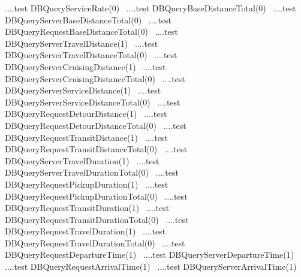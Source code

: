 \documentclass{article}
\def\nwendcode{\endtrivlist \endgroup}
\let\nwdocspar=\par
\begin{document}
\LA{}....test \code{}DBQueryServiceRate\edoc{}(0)~{\nwtagstyle{}}\RA{}
\LA{}....test \code{}DBQueryBaseDistanceTotal\edoc{}(0)~{\nwtagstyle{}}\RA{}
\LA{}....test \code{}DBQueryServerBaseDistanceTotal\edoc{}(0)~{\nwtagstyle{}}\RA{}
\LA{}....test \code{}DBQueryRequestBaseDistanceTotal\edoc{}(0)~{\nwtagstyle{}}\RA{}
\LA{}....test \code{}DBQueryServerTravelDistance\edoc{}(1)~{\nwtagstyle{}}\RA{}
\LA{}....test \code{}DBQueryServerTravelDistanceTotal\edoc{}(0)~{\nwtagstyle{}}\RA{}
\LA{}....test \code{}DBQueryServerCruisingDistance\edoc{}(1)~{\nwtagstyle{}}\RA{}
\LA{}....test \code{}DBQueryServerCruisingDistanceTotal\edoc{}(0)~{\nwtagstyle{}}\RA{}
\LA{}....test \code{}DBQueryServerServiceDistance\edoc{}(1)~{\nwtagstyle{}}\RA{}
\LA{}....test \code{}DBQueryServerServiceDistanceTotal\edoc{}(0)~{\nwtagstyle{}}\RA{}
\LA{}....test \code{}DBQueryRequestDetourDistance\edoc{}(1)~{\nwtagstyle{}}\RA{}
\LA{}....test \code{}DBQueryRequestDetourDistanceTotal\edoc{}(0)~{\nwtagstyle{}}\RA{}
\LA{}....test \code{}DBQueryRequestTransitDistance\edoc{}(1)~{\nwtagstyle{}}\RA{}
\LA{}....test \code{}DBQueryRequestTransitDistanceTotal\edoc{}(0)~{\nwtagstyle{}}\RA{}
\LA{}....test \code{}DBQueryServerTravelDuration\edoc{}(1)~{\nwtagstyle{}}\RA{}
\LA{}....test \code{}DBQueryServerTravelDurationTotal\edoc{}(0)~{\nwtagstyle{}}\RA{}
\LA{}....test \code{}DBQueryRequestPickupDuration\edoc{}(1)~{\nwtagstyle{}}\RA{}
\LA{}....test \code{}DBQueryRequestPickupDurationTotal\edoc{}(0)~{\nwtagstyle{}}\RA{}
\LA{}....test \code{}DBQueryRequestTransitDuration\edoc{}(1)~{\nwtagstyle{}}\RA{}
\LA{}....test \code{}DBQueryRequestTransitDurationTotal\edoc{}(0)~{\nwtagstyle{}}\RA{}
\LA{}....test \code{}DBQueryRequestTravelDuration\edoc{}(1)~{\nwtagstyle{}}\RA{}
\LA{}....test \code{}DBQueryRequestTravelDurationTotal\edoc{}(0)~{\nwtagstyle{}}\RA{}
\LA{}....test \code{}DBQueryRequestDepartureTime\edoc{}(1)~{\nwtagstyle{}}\RA{}
\LA{}....test \code{}DBQueryServerDepartureTime\edoc{}(1)~{\nwtagstyle{}}\RA{}
\LA{}....test \code{}DBQueryRequestArrivalTime\edoc{}(1)~{\nwtagstyle{}}\RA{}
\LA{}....test \code{}DBQueryServerArrivalTime\edoc{}(1)~{\nwtagstyle{}}\RA{}
\nwendcode{}\nwdocspar
\end{document}
